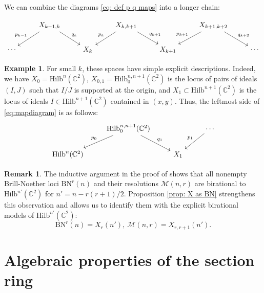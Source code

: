 \documentclass[12pt]{amsart}
\newcommand{\Hilb}{\mathrm{Hilb}}
\newcommand{\C}{\mathbb{C}}
\newcommand{\BN}{\mathrm{BN}}
\numberwithin{equation}{section}
\theoremstyle{definition}
\newtheorem{remark}[theorem]{Remark}
\newtheorem{example}[theorem]{Example}
\begin{document}




We can combine the diagrams \eqref{eq: def p q maps} into a longer chain:

\begin{equation}\label{eq:mapdiagram}
    \begin{tikzcd}
    &X_{k-1,k} \arrow[dl,"p_{k-1}"'] \arrow[dr,"q_k"] && X_{k,k+1} \arrow[dl,"p_k"'] \arrow[dr,"q_{k+1}"] && X_{k+1,k+2} \arrow[dl,"p_{k+1}"']\arrow[dr,"q_{k+2}"] \\
    \cdots &&X_k && X_{k+1} && \cdots
\end{tikzcd}
\end{equation} 

\begin{example}
    For small $k$, these spaces have simple explicit descriptions. Indeed, we have $X_0 = \Hilb^n(\C^2)$, $X_{0,1} = \Hilb^{n,n+1}_0(\C^2)$ is the locus of pairs of ideals $(I,J)$ such that  $I/J$ is supported at the origin, and $X_1 \subset\Hilb^{n+1}(\C^2)$   is the locus of ideals $I\in \Hilb^{n+1}(\C^2)$ contained in $(x,y)$. Thus, the leftmost side of \eqref{eq:mapdiagram} is as follows:
    \[
        \begin{tikzcd}
        & \Hilb^{n,n+1}_0(\C^2) \arrow[dl,"p_0"'] \arrow[dr,"q_{1}"] && \cdots \arrow[dl,"p_{1}"'] \\
        \Hilb^n(\C^2) && X_1 
    \end{tikzcd}
    \]
\end{example}

\begin{remark}
The inductive argument in the proof of \cite[Theorem 3.3]{Bayer} shows that
all nonempty Brill-Noether loci $\BN^r(n)$ and their resolutions $\mathcal{M}(n,r)$ are birational to $\Hilb^{n'}(\C^2)$ for  $n'=n-r(r+1)/2$.
Proposition \ref{prop: X as BN} strengthens this observation and allows us to identify them with the explicit birational models of $\Hilb^{n'}(\C^2)$:
$$
\BN^r(n)=X_{r}(n'),\ \mathcal{M}(n,r)=X_{r,r+1}(n').
$$

\end{remark}

\section{Algebraic properties of the section ring}\label{sec:finitegenerationfacts}
\end{document}
